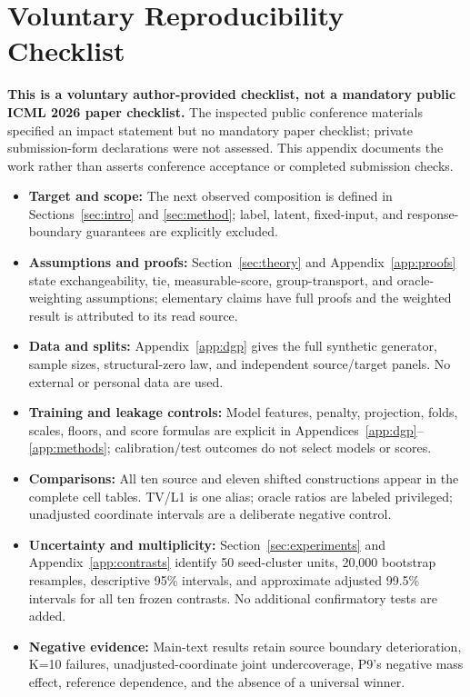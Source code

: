 \documentclass{article}
\theoremstyle{plain}
\begin{document}
\clearpage
\section{Voluntary Reproducibility Checklist}
\label{app:checklist}
\textbf{This is a voluntary author-provided checklist, not a mandatory public ICML 2026 paper checklist.} The inspected public conference materials specified an impact statement but no mandatory paper checklist; private submission-form declarations were not assessed. This appendix documents the work rather than asserts conference acceptance or completed submission checks.
\begin{itemize}
\item \textbf{Target and scope:} The next observed composition is defined in Sections~\ref{sec:intro} and \ref{sec:method}; label, latent, fixed-input, and response-boundary guarantees are explicitly excluded.
\item \textbf{Assumptions and proofs:} Section~\ref{sec:theory} and Appendix~\ref{app:proofs} state exchangeability, tie, measurable-score, group-transport, and oracle-weighting assumptions; elementary claims have full proofs and the weighted result is attributed to its read source.
\item \textbf{Data and splits:} Appendix~\ref{app:dgp} gives the full synthetic generator, sample sizes, structural-zero law, and independent source/target panels. No external or personal data are used.
\item \textbf{Training and leakage controls:} Model features, penalty, projection, folds, scales, floors, and score formulas are explicit in Appendices~\ref{app:dgp}--\ref{app:methods}; calibration/test outcomes do not select models or scores.
\item \textbf{Comparisons:} All ten source and eleven shifted constructions appear in the complete cell tables. TV/L1 is one alias; oracle ratios are labeled privileged; unadjusted coordinate intervals are a deliberate negative control.
\item \textbf{Uncertainty and multiplicity:} Section~\ref{sec:experiments} and Appendix~\ref{app:contrasts} identify 50 seed-cluster units, 20,000 bootstrap resamples, descriptive 95\% intervals, and approximate adjusted 99.5\% intervals for all ten frozen contrasts. No additional confirmatory tests are added.
\item \textbf{Negative evidence:} Main-text results retain source boundary deterioration, K=10 failures, unadjusted-coordinate joint undercoverage, P9's negative mass effect, reference dependence, and the absence of a universal winner.

\end{itemize}
\end{document}
